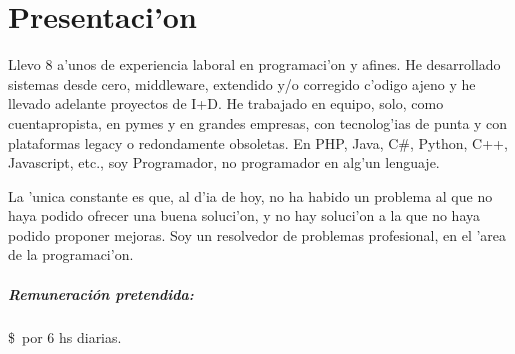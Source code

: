 \documentclass[a4paper,10pt, spanish]{article}
\newcommand\remuneracion{}
\renewcommand\remuneracion{}
\renewcommand\remuneracion{\subparagraph{Remuneraci\'on pretendida:}\$\number\platita\ por 6 hs diarias.}
\begin{document}
\maketitle


\section{Presentaci'on}
Llevo 8 a'unos de experiencia laboral en programaci'on y afines.  He desarrollado sistemas desde cero, middleware, extendido y/o corregido c'odigo ajeno y he llevado adelante proyectos de I+D.  He trabajado en equipo, solo, como cuentapropista, en pymes y en grandes empresas, con tecnolog'ias de punta y con plataformas legacy o redondamente obsoletas.  En PHP, Java, C\#, Python, C++, Javascript, etc., soy Programador, no programador en alg'un lenguaje.

La 'unica constante es que, al d'ia de hoy, no ha habido un problema al que no haya podido ofrecer una buena soluci'on, y no hay soluci'on a la que no haya podido proponer mejoras.  Soy un resolvedor de problemas profesional, en el 'area de la programaci'on.








%


%




\remuneracion
\end{document}
